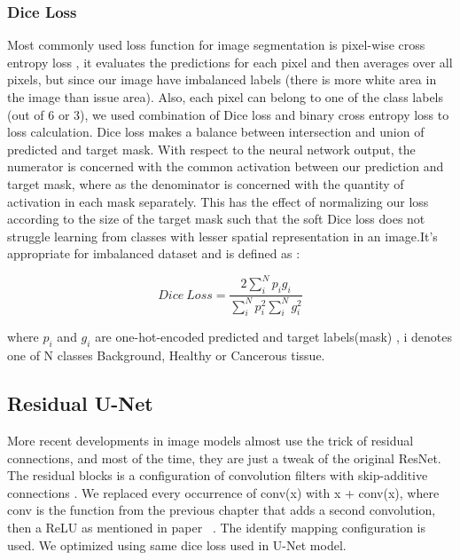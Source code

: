 \documentclass[10pt,twocolumn,letterpaper]{article}
\begin{document}
\subsubsection{Dice Loss} 
Most commonly used loss function for image segmentation is pixel-wise cross entropy loss , it evaluates the predictions for each pixel and then averages over all pixels, but since our image have imbalanced labels (there is more white area in the image than issue area). Also, each pixel can belong to one of the class labels (out of 6 or 3), we used combination of Dice loss and binary cross entropy loss to loss calculation. Dice loss makes a balance between intersection and union of predicted and target mask. With respect to the neural network output, the numerator is concerned with the common activation between our prediction and target mask, where as the denominator is concerned with the quantity of activation in each mask separately. This has the effect of normalizing our loss according to the size of the target mask such that the soft Dice loss does not struggle learning from classes with lesser spatial representation in an image.It's appropriate for imbalanced dataset and is defined as :

\begin{equation}
Dice \ Loss = \frac{2 \sum_{i}^N p_i g_i}{ \sum_{i}^N p_i^2 \sum_{i}^N g_i^2}
\end{equation}

where $p_i$ and $g_i$ are one-hot-encoded predicted and target labels(mask) , i denotes one of N classes Background, Healthy or Cancerous tissue.

\subsection{Residual U-Net}
More recent developments in image models almost  use the trick of residual connections, and most of the time, they are just a tweak of the original ResNet. The residual blocks is a configuration of convolution filters with skip-additive connections \cite{DBLP:journals/corr/DrozdzalVCKP16}. We replaced every occurrence of conv(x) with x + conv(x), where conv is the function from the previous chapter that adds a second convolution, then a ReLU as mentioned in paper ~\cite{Amartya}. The identify mapping configuration is used. We optimized using same dice loss used in U-Net model. 
\end{document}
